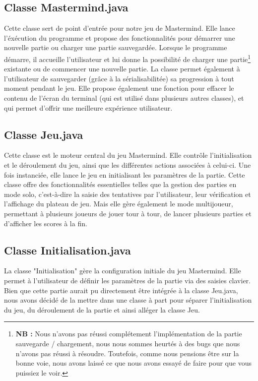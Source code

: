 \documentclass[french]{article}
\begin{document}
\subsection{Classe Mastermind.java}
Cette classe sert de point d'entrée pour notre jeu de Mastermind. Elle lance l'éxécution du programme et propose des fonctionnalités pour démarrer une nouvelle partie ou charger une partie sauvegardée. Lorsque le programme démarre, il accueille l'utilisateur et lui donne la possibilité de charger une partie\footnote{\textbf{NB :} Nous n'avons pas réussi complétement l'implémentation de la partie sauvegarde / chargement, nous nous sommes heurtés à des bugs que nous n'avons pas réussi à résoudre. Toutefois, comme nous pensions être sur la bonne voie, nous avons laissé ce que nous avons essayé de faire pour que vous puissiez le voir.} existante ou de commencer une nouvelle partie. La classe permet également à l'utilisateur de sauvegarder (grâce à la sérialisabilitée) sa progression à tout moment pendant le jeu. Elle propose également une fonction pour effacer le contenu de l'écran du terminal (qui est utilisé dans plusieurs autres classes), et qui permet d'offrir une meilleure expérience utilisateur.

\subsection{Classe Jeu.java}
Cette classe est le moteur central du jeu Mastermind. Elle contrôle l'initialisation et le déroulement du jeu, ainsi que les différentes actions associées à celui-ci. Une fois instanciée, elle lance le jeu en initialisant les paramètres de la partie. Cette classe offre des fonctionnalités essentielles telles que la gestion des parties en mode solo, c'est-à-dire la saisie des tentatives par l'utilisateur, leur vérification et l'affichage du plateau de jeu. Mais elle gère également le mode multijoueur, permettant à plusieurs joueurs de jouer tour à tour, de lancer plusieurs parties et d'afficher les scores à la fin.

\subsection{Classe Initialisation.java}
La classe "Initialisation" gère la configuration initiale du jeu Mastermind. Elle permet à l'utilisateur de définir les paramètres de la partie via des saisies clavier. Bien que cette partie aurait pu directement être intégrée à la classe Jeu.java, nous avons décidé de la mettre dans une classe à part pour séparer l'initialisation du jeu, du déroulement de la partie et ainsi alléger la classe Jeu.
\end{document}
